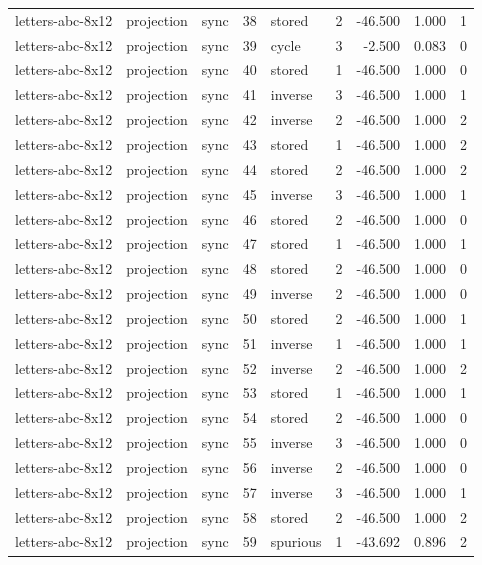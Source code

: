 \begin{tabular}{lllrlrrrr}
letters-abc-8x12 & projection & sync & 38 & stored & 2 & -46.500 & 1.000 & 1 \\
letters-abc-8x12 & projection & sync & 39 & cycle & 3 & -2.500 & 0.083 & 0 \\
letters-abc-8x12 & projection & sync & 40 & stored & 1 & -46.500 & 1.000 & 0 \\
letters-abc-8x12 & projection & sync & 41 & inverse & 3 & -46.500 & 1.000 & 1 \\
letters-abc-8x12 & projection & sync & 42 & inverse & 2 & -46.500 & 1.000 & 2 \\
letters-abc-8x12 & projection & sync & 43 & stored & 1 & -46.500 & 1.000 & 2 \\
letters-abc-8x12 & projection & sync & 44 & stored & 2 & -46.500 & 1.000 & 2 \\
letters-abc-8x12 & projection & sync & 45 & inverse & 3 & -46.500 & 1.000 & 1 \\
letters-abc-8x12 & projection & sync & 46 & stored & 2 & -46.500 & 1.000 & 0 \\
letters-abc-8x12 & projection & sync & 47 & stored & 1 & -46.500 & 1.000 & 1 \\
letters-abc-8x12 & projection & sync & 48 & stored & 2 & -46.500 & 1.000 & 0 \\
letters-abc-8x12 & projection & sync & 49 & inverse & 2 & -46.500 & 1.000 & 0 \\
letters-abc-8x12 & projection & sync & 50 & stored & 2 & -46.500 & 1.000 & 1 \\
letters-abc-8x12 & projection & sync & 51 & inverse & 1 & -46.500 & 1.000 & 1 \\
letters-abc-8x12 & projection & sync & 52 & inverse & 2 & -46.500 & 1.000 & 2 \\
letters-abc-8x12 & projection & sync & 53 & stored & 1 & -46.500 & 1.000 & 1 \\
letters-abc-8x12 & projection & sync & 54 & stored & 2 & -46.500 & 1.000 & 0 \\
letters-abc-8x12 & projection & sync & 55 & inverse & 3 & -46.500 & 1.000 & 0 \\
letters-abc-8x12 & projection & sync & 56 & inverse & 2 & -46.500 & 1.000 & 0 \\
letters-abc-8x12 & projection & sync & 57 & inverse & 3 & -46.500 & 1.000 & 1 \\
letters-abc-8x12 & projection & sync & 58 & stored & 2 & -46.500 & 1.000 & 2 \\
letters-abc-8x12 & projection & sync & 59 & spurious & 1 & -43.692 & 0.896 & 2 \\

\end{tabular}
